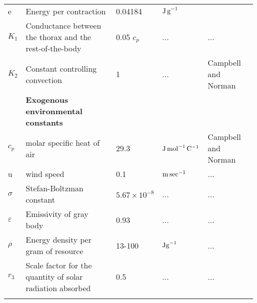\begin{sidewaystable}
\begin{tabular}{l l l l l}
e & Energy per contraction & 0.04184 & $\rm{J \, g}^{-1}$ &\citet{Kammer1974} \\
$K_1$& Conductance between the thorax and the rest-of-the-body & 0.05 $c_p$ & ... & ... \\
$K_2$& Constant controlling convection & 1   & ... & Campbell and Norman \\
\hline
& \textbf{Exogenous environmental constants} & & &  \\
$c_p$ & molar specific heat of air  & 29.3 &  $\rm{J \, mol}^ {-1} \, \rm{C}^ {-1}$ & Campbell and Norman \\
u &  wind speed & 0.1 & $\rm{m \, sec}^{-1}$ & ...\\
$\sigma$ & Stefan-Boltzman constant & $5.67 \times 10^{-8}$ & ... & ...\\
$\varepsilon$& Emissivity of gray body & 0.93& ...& ... \\
$\rho$ &Energy density per gram of resource & 13-100 &  $\rm{J g}^{-1}$  & ... \\  %
$r_3$  & Scale factor for the quantity of solar radiation absorbed & 0.5 & ... & ... \\
\hline
\label{table:table1}
\end{tabular}
\end{sidewaystable}

